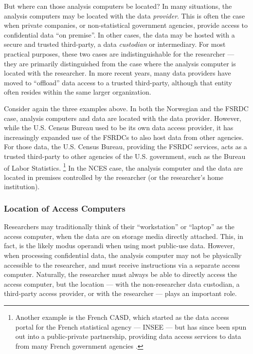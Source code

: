 But where can those analysis computers be located? In many situations, the analysis computers may be located with the data \textit{provider}. This is often the case when private companies, or non-statistical government agencies, provide access to confidential data ``on premise''. In other cases, the data may be hosted with a secure and trusted third-party, a data \textit{custodian} or intermediary. For most practical purposes, these two cases are indistinguishable for the researcher --- they are primarily distinguished from the case where the analysis computer is located with the researcher. In more recent years, many data providers have moved to ``offload'' data access to a trusted third-party, although that entity often resides within the same larger organization. 

Consider again the three examples above. In both the Norwegian and the FSRDC case, analysis computers and data are located with the data provider. However, while the U.S. Census Bureau used to be its own data access provider, it has increasingly expanded use of the \acp{FSRDC} to also host data from other agencies. For those data, the U.S. Census Bureau, providing the FSRDC services, acts as a trusted third-party to other agencies of the U.S. government, such as the Bureau of Labor Statistics.%
\footnote{Another example is the French \ac{CASD}, which started as the data access portal for the French statistical agency --- \ac{INSEE} --- but has since been spun out into a public-private partnership, providing data access services to data from many French government agencies \citep{SILBERMAN_2021}.} In the NCES case, the analysis computer and the data are located in premises controlled by the researcher (or the researcher's home institution).

\subsubsection{Location of Access Computers}

Researchers may traditionally think of their ``workstation'' or ``laptop'' as the access computer, when the data are on storage media directly attached. This, in fact, is the likely modus operandi when using most public-use data. However, when processing confidential data,  the analysis computer may not be physically accessible to the researcher, and must receive instructions via a separate access computer. Naturally, the researcher must always be able to directly access the access computer, but the location ---  with the non-researcher data custodian, a third-party access provider, or with the researcher --- plays an important role. 

